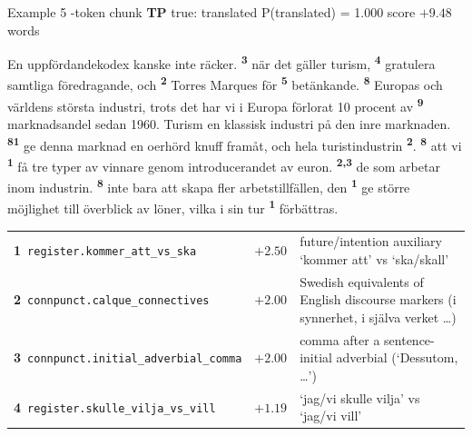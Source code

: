 \begin{exbox}[]{Example 5 -token chunk \quad \textbf{TP} \quad true: translated \quad P(translated) = 1.000 \quad score $+9.48$  words}
{\setlength{\parindent}{0pt}\raggedright En uppfördandekodex kanske inte räcker. \textsuperscript{\sffamily\bfseries 3} när det gäller turism, \textsuperscript{\sffamily\bfseries 4} gratulera samtliga föredragande, och \textsuperscript{\sffamily\bfseries 2} Torres Marques för \textsuperscript{\sffamily\bfseries 5} betänkande. \textsuperscript{\sffamily\bfseries 8} Europas och världens största industri, trots det har vi i Europa förlorat 10 procent av \textsuperscript{\sffamily\bfseries 9} marknadsandel sedan 1960. Turism en klassisk industri på den inre marknaden. \textsuperscript{\sffamily\bfseries 8}\textsuperscript{\sffamily\bfseries 1} ge denna marknad en oerhörd knuff framåt, och hela turistindustrin \textsuperscript{\sffamily\bfseries 2}. \textsuperscript{\sffamily\bfseries 8} att vi \textsuperscript{\sffamily\bfseries 1} få tre typer av vinnare genom introducerandet av euron. \textsuperscript{\sffamily\bfseries 2,3} de som arbetar inom industrin. \textsuperscript{\sffamily\bfseries 8} inte bara att skapa fler arbetstillfällen, den \textsuperscript{\sffamily\bfseries 1} ge större möjlighet till överblick av löner, vilka i sin tur \textsuperscript{\sffamily\bfseries 1} förbättras.}
\par\medskip
{\footnotesize
\begin{tabularx}{\linewidth}{@{}l r X@{}}
\textbf{1}~\texttt{register.kommer\_att\_vs\_ska} & $+2.50$ & future/intention auxiliary `kommer att' vs `ska/skall' \\
\textbf{2}~\texttt{connpunct.calque\_connectives} & $+2.00$ & Swedish equivalents of English discourse markers (i synnerhet, i själva verket \ldots{}) \\
\textbf{3}~\texttt{connpunct.initial\_adverbial\_comma} & $+2.00$ & comma after a sentence-initial adverbial (`Dessutom, \ldots{}') \\
\textbf{4}~\texttt{register.skulle\_vilja\_vs\_vill} & $+1.19$ & `jag/vi skulle vilja' vs `jag/vi vill' \\

\end{tabularx}}
\end{exbox}
